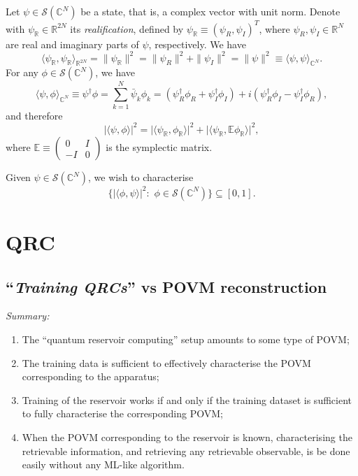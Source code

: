 \documentclass[12pt]{report}
\newcommand{\CC}{\mathbb{C}}
\newcommand{\EE}{\mathbb{E}}
\newcommand{\RR}{\mathbb{R}}
\newcommand{\calS}{{\mathcal{S}}}
\begin{document}
Let $\psi\in\calS(\CC^N)$ be a state, that is, a complex vector with unit norm.
Denote with $\psi_\RR\in\RR^{2N}$ its \emph{realification}, defined by
$\psi_\RR\equiv(\psi_R,\psi_I)^T$, where $\psi_R,\psi_I\in\RR^N$ are real and imaginary parts of $\psi$, respectively. We have
\begin{equation}
	\langle \psi_\RR,\psi_\RR\rangle_{\RR^{2N}}
	= \|\psi_\RR\|^2 = \|\psi_R\|^2 + \|\psi_I\|^2
	= \|\psi\|^2 \equiv \langle \psi,\psi\rangle_{\CC^N}.
\end{equation}
For any $\phi\in\calS(\CC^N)$, we have
\begin{equation}
	\langle \psi,\phi\rangle_{\CC^N}
	\equiv \psi^\dagger \phi
	= \sum_{k=1}^N \bar\psi_k \phi_k
	= (\psi_R^\dagger\phi_R + \psi_I^\dagger \phi_I)
	+ i(\psi_R^\dagger \phi_I - \psi_I^\dagger\phi_R),
\end{equation}
and therefore
\begin{equation}
	\lvert\langle \psi,\phi\rangle\rvert^2
	= \lvert \langle \psi_\RR,\phi_\RR\rangle \rvert^2
	+ \lvert \langle \psi_\RR,\EE\phi_\RR\rangle \rvert^2,
\end{equation}
where $\EE\equiv \begin{pmatrix}0 & I \\ -I & 0\end{pmatrix}$ is the symplectic matrix.

Given $\psi\in\calS(\CC^N)$, we wish to characterise
\begin{equation}
	\{ \lvert\langle \phi,\psi\rangle\rvert^2 : \,\,\phi\in\calS(\CC^N) \}
	\subseteq [0,1].
\end{equation}

\section{QRC}

\subsection{``\emph{Training QRCs}'' vs POVM reconstruction}
\emph{Summary:}
\begin{enumerate}
	\item The ``quantum reservoir computing'' setup amounts to some type of POVM;
	\item The training data is sufficient to effectively characterise the POVM corresponding to the apparatus;
	\item Training of the reservoir works if and only if the training dataset is sufficient to fully characterise the corresponding POVM;
	\item When the POVM corresponding to the reservoir is known, characterising the retrievable information, and retrieving any retrievable observable, is be done easily without any ML-like algorithm.
\end{enumerate}
\end{document}

